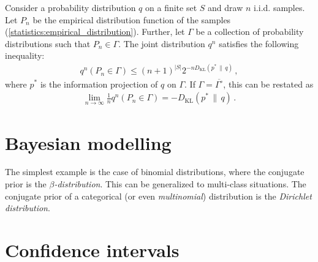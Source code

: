     \begin{theorem}[Sanov]
        Consider a probability distribution $q$ on a finite set $S$ and draw $n$ i.i.d. samples. Let $P_n$ be the empirical distribution function of the samples (\cref{statistics:empirical_distribution}). Further, let $\Gamma$ be a collection of probability distributions such that $P_n\in\Gamma$. The joint distribution $q^n$ satisfies the following inequality:
        \begin{gather}
            q^n(P_n\in\Gamma) \leq (n+1)^{|S|}2^{-n D_{\text{KL}}(p^*\,\|\,q)}\,,
        \end{gather}
        where $p^*$ is the information projection of $q$ on $\Gamma$. If $\Gamma=\overline{\Gamma^\circ}$, this can be restated as
        \begin{gather}
            \lim_{n\rightarrow\infty}\frac{1}{n}q^n(P_n\in\Gamma) = - D_{\text{KL}}(p^*\,\|\,q)\,.
        \end{gather}
    \end{theorem}

\section{Bayesian modelling}

    \begin{example}
        The simplest example is the case of binomial distributions, where the conjugate prior is the \textit{$\beta$-distribution}. This can be generalized to multi-class situations. The conjugate prior of a categorical (or even \textit{multinomial}) distribution is the \textit{Dirichlet distribution}.
    \end{example}

\section{Confidence intervals}\label{section:confidence}

